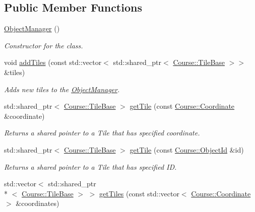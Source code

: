 \subsection*{Public Member Functions}
\begin{DoxyCompactItemize}
\item 
\hyperlink{classGame_1_1ObjectManager_a3f115e31fadbd2c0e3fbde6715d1bed3}{Object\-Manager} ()
\begin{DoxyCompactList}\small\item\em Constructor for the class. \end{DoxyCompactList}\item 
void \hyperlink{classGame_1_1ObjectManager_a92fb3bc8bebd8d08bf080ead20cfff10}{add\-Tiles} (const std\-::vector$<$ std\-::shared\-\_\-ptr$<$ \hyperlink{classCourse_1_1TileBase}{Course\-::\-Tile\-Base} $>$$>$ \&tiles)
\begin{DoxyCompactList}\small\item\em Adds new tiles to the \hyperlink{classGame_1_1ObjectManager}{Object\-Manager}. \end{DoxyCompactList}\item 
std\-::shared\-\_\-ptr$<$ \hyperlink{classCourse_1_1TileBase}{Course\-::\-Tile\-Base} $>$ \hyperlink{classGame_1_1ObjectManager_a0d1b58925d8baca124f611a697ea987c}{get\-Tile} (const \hyperlink{classCourse_1_1Coordinate}{Course\-::\-Coordinate} \&coordinate)
\begin{DoxyCompactList}\small\item\em Returns a shared pointer to a Tile that has specified coordinate. \end{DoxyCompactList}\item 
std\-::shared\-\_\-ptr$<$ \hyperlink{classCourse_1_1TileBase}{Course\-::\-Tile\-Base} $>$ \hyperlink{classGame_1_1ObjectManager_a299c9708f9e405d78a10b0aa7d1658aa}{get\-Tile} (const \hyperlink{namespaceCourse_a9a16e743c9813da00109e4991afd2f3e}{Course\-::\-Object\-Id} \&id)
\begin{DoxyCompactList}\small\item\em Returns a shared pointer to a Tile that has specified I\-D. \end{DoxyCompactList}\item 
std\-::vector$<$ std\-::shared\-\_\-ptr\\*
$<$ \hyperlink{classCourse_1_1TileBase}{Course\-::\-Tile\-Base} $>$ $>$ \hyperlink{classGame_1_1ObjectManager_ad4646477bd85b931f028a1a8f5916f3e}{get\-Tiles} (const std\-::vector$<$ \hyperlink{classCourse_1_1Coordinate}{Course\-::\-Coordinate} $>$ \&coordinates)
$$
\end{DoxyCompactItemize}
